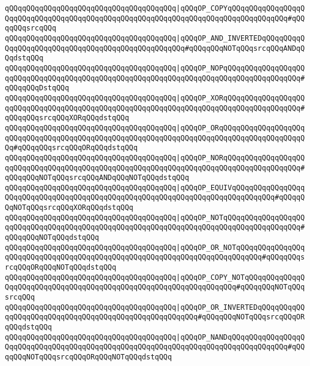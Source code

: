 \verb|qQQqqQQqqQQqqQQqqQQqqQQqqQQqqQQqqQQqqQQq|\verb#|qQQqOP_COPYqQQqqQQqqQQqqQQqqQQqqQQqqQQqqQQqqQQqqQQqqQQqqQQqqQQqqQQqqQQqqQQqqQQqqQQqqQQqqQQqqQQq#\verb|#qQQqqQQqsrcqQQq|\newline
\verb|qQQqqQQqqQQqqQQqqQQqqQQqqQQqqQQqqQQqqQQq|\verb#|qQQqOP_AND_INVERTEDqQQqqQQqqQQqqQQqqQQqqQQqqQQqqQQqqQQqqQQqqQQqqQQqqQQq#\verb|#qQQqqQQqNOTqQQqsrcqQQqANDqQQqdstqQQq|\newline
\verb|qQQqqQQqqQQqqQQqqQQqqQQqqQQqqQQqqQQqqQQq|\verb#|qQQqOP_NOPqQQqqQQqqQQqqQQqqQQqqQQqqQQqqQQqqQQqqQQqqQQqqQQqqQQqqQQqqQQqqQQqqQQqqQQqqQQqqQQqqQQqqQQq#\verb|#qQQqqQQqDstqQQq|\newline
\verb|qQQqqQQqqQQqqQQqqQQqqQQqqQQqqQQqqQQqqQQq|\verb#|qQQqOP_XORqQQqqQQqqQQqqQQqqQQqqQQqqQQqqQQqqQQqqQQqqQQqqQQqqQQqqQQqqQQqqQQqqQQqqQQqqQQqqQQqqQQqqQQq#\verb|#qQQqqQQqsrcqQQqXORqQQqdstqQQq|\newline
\verb|qQQqqQQqqQQqqQQqqQQqqQQqqQQqqQQqqQQqqQQq|\verb#|qQQqOP_ORqQQqqQQqqQQqqQQqqQQqqQQqqQQqqQQqqQQqqQQqqQQqqQQqqQQqqQQqqQQqqQQqqQQqqQQqqQQqqQQqqQQqqQQqqQQq#\verb|#qQQqqQQqsrcqQQqORqQQqdstqQQq|\newline
\verb|qQQqqQQqqQQqqQQqqQQqqQQqqQQqqQQqqQQqqQQq|\verb#|qQQqOP_NORqQQqqQQqqQQqqQQqqQQqqQQqqQQqqQQqqQQqqQQqqQQqqQQqqQQqqQQqqQQqqQQqqQQqqQQqqQQqqQQqqQQqqQQq#\verb|#qQQqqQQqNOTqQQqsrcqQQqANDqQQqNOTqQQqdstqQQq|\newline
\verb|qQQqqQQqqQQqqQQqqQQqqQQqqQQqqQQqqQQqqQQq|\verb#|qQQqOP_EQUIVqQQqqQQqqQQqqQQqqQQqqQQqqQQqqQQqqQQqqQQqqQQqqQQqqQQqqQQqqQQqqQQqqQQqqQQqqQQqqQQq#\verb|#qQQqqQQqNOTqQQqsrcqQQqXORqQQqdstqQQq|\newline
\verb|qQQqqQQqqQQqqQQqqQQqqQQqqQQqqQQqqQQqqQQq|\verb#|qQQqOP_NOTqQQqqQQqqQQqqQQqqQQqqQQqqQQqqQQqqQQqqQQqqQQqqQQqqQQqqQQqqQQqqQQqqQQqqQQqqQQqqQQqqQQqqQQq#\verb|#qQQqqQQqNOTqQQqdstqQQq|\newline
\verb|qQQqqQQqqQQqqQQqqQQqqQQqqQQqqQQqqQQqqQQq|\verb#|qQQqOP_OR_NOTqQQqqQQqqQQqqQQqqQQqqQQqqQQqqQQqqQQqqQQqqQQqqQQqqQQqqQQqqQQqqQQqqQQqqQQqqQQq#\verb|#qQQqqQQqsrcqQQqORqQQqNOTqQQqdstqQQq|\newline
\verb|qQQqqQQqqQQqqQQqqQQqqQQqqQQqqQQqqQQqqQQq|\verb#|qQQqOP_COPY_NOTqQQqqQQqqQQqqQQqqQQqqQQqqQQqqQQqqQQqqQQqqQQqqQQqqQQqqQQqqQQqqQQqqQQq#\verb|#qQQqqQQqNOTqQQqsrcqQQq|\newline
\verb|qQQqqQQqqQQqqQQqqQQqqQQqqQQqqQQqqQQqqQQq|\verb#|qQQqOP_OR_INVERTEDqQQqqQQqqQQqqQQqqQQqqQQqqQQqqQQqqQQqqQQqqQQqqQQqqQQqqQQq#\verb|#qQQqqQQqNOTqQQqsrcqQQqORqQQqdstqQQq|\newline
\verb|qQQqqQQqqQQqqQQqqQQqqQQqqQQqqQQqqQQqqQQq|\verb#|qQQqOP_NANDqQQqqQQqqQQqqQQqqQQqqQQqqQQqqQQqqQQqqQQqqQQqqQQqqQQqqQQqqQQqqQQqqQQqqQQqqQQqqQQqqQQq#\verb|#qQQqqQQqNOTqQQqsrcqQQqORqQQqNOTqQQqdstqQQq|\newline
